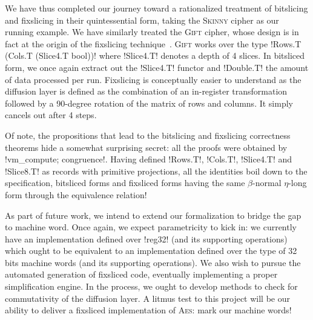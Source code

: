 \documentclass[draft,english]{jflart}
\newcommand{\Skinny}{\textsc{Skinny}}
\newcommand{\Gift}{\textsc{Gift}}
\newcommand{\AES}{\textsc{Aes}}
\begin{document}
We have thus completed our journey toward a rationalized treatment of
bitslicing and fixslicing in their quintessential form, taking the
\Skinny{} cipher as our running example.
%
%
We have similarly treated the \Gift{} cipher, whose design is in fact at
the origin of the fixslicing
technique~\citep{adominicai:fixslicing-gift}. \Gift{} works over the type
%
\coqe!Rows.T (Cols.T (Slice4.T bool))!
%
where \coqe!Slice4.T! denotes a depth of 4 slices. In bitsliced form,
we once again extract out the \coqe!Slice4.T! functor and
\coqe!Double.T! the amount of data processed per run. Fixslicing is
conceptually easier to understand as the diffusion layer is defined as
the combination of an in-register transformation followed by a
90-degree rotation of the matrix of rows and columns. It simply
cancels out after 4 steps.


Of note, the propositions that lead to the bitslicing and fixslicing
correctness theorems hide a somewhat surprising secret: all the proofs
were obtained by \coqe!vm_compute; congruence!. Having defined
\coqe!Rows.T!, \coqe!Cols.T!, \coqe!Slice4.T! and \coqe!Slice8.T! as
records with primitive projections, all the identities boil down to
the specification, bitsliced forms and fixsliced forms having the
same $\beta$-normal $\eta$-long form through the equivalence
relation!



As part of future work, we intend to extend our formalization to
bridge the gap to machine word. Once again, we expect parametricity to
kick in: we currently have an implementation defined over \coqe!reg32!
(and its supporting operations) which ought to be equivalent to an
implementation defined over the type of 32 bits machine words (and its
supporting operations).
%
We also wish to pursue the automated generation of fixsliced code,
eventually implementing a proper simplification engine. In the
process, we ought to develop methods to check for commutativity of the
diffusion layer.
%
A litmus test to this project will be our ability to deliver a
fixsliced implementation of \AES{}: mark our machine words!



\end{document}
